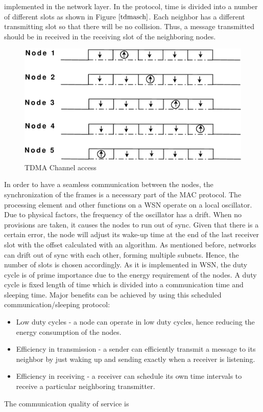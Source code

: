 \documentclass[a4paper,10pt]{report}
\begin{document}
implemented in the network layer.
\newline
In the protocol, time is divided into a number of different slots as
shown in Figure $\ref{tdmasch}$. Each neighbor has a different
transmitting slot so that there will be no collision. Thus, a
message transmitted should be in received in the receiving slot of
the neighboring nodes.
\begin{figure}
\centering
\includegraphics[width=0.75 \textwidth]{tdmaschedule}
\caption{TDMA Channel access} \label{tdmasch}
\end{figure}
In order to have a seamless communication between the nodes, the
synchronization of the frames is a necessary part of the MAC
protocol. The processing element and other functions on a WSN
operate on a local oscillator. Due to physical factors, the
frequency of the oscillator has a drift. When no provisions are
taken, it causes the nodes to run out of sync. Given that there is a
certain error, the node will adjust its wake-up time at the end of
the last receiver slot with the offset calculated with an algorithm.
As mentioned before, networks can drift out of sync with each other,
forming multiple subnets. Hence, the number of slots is chosen
accordingly.
\newline  As it is implemented in WSN, the duty
cycle is of prime importance due to the energy requirement of the
nodes. A duty cycle is fixed length of time which is divided into a
communication time and sleeping time. Major benefits can be achieved
by using this scheduled communication/sleeping protocol:
\begin{itemize}
\item Low duty cycles - a node can operate in low duty cycles, hence reducing the
energy consumption of the nodes.
\item Efficiency in transmission - a sender can efficiently transmit a message to its
neighbor by just waking up and sending exactly when a receiver is
listening.
\item Efficiency in receiving - a receiver can schedule
its own time intervals to receive a particular neighboring
transmitter. \end{itemize} The communication quality of service is
\end{document}
